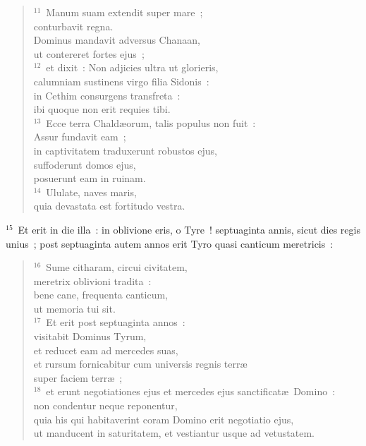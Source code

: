 \begin{flushleft}
\begin{verse}
${}^{11}$~Manum suam extendit super mare~;\\ conturbavit regna.\\ Dominus mandavit adversus Chanaan,\\ ut contereret fortes ejus~;\\
${}^{12}$~et dixit~: Non adjicies ultra ut glorieris,\\ calumniam sustinens virgo filia Sidonis~:\\ in Cethim consurgens transfreta~:\\ ibi quoque non erit requies tibi.\\
${}^{13}$~Ecce terra Chald\ae orum, talis populus non fuit~:\\ Assur fundavit eam~;\\ in captivitatem traduxerunt robustos ejus,\\ suffoderunt domos ejus,\\ posuerunt eam in ruinam.\\
${}^{14}$~Ululate, naves maris,\\ quia devastata est fortitudo vestra.\end{verse}\end{flushleft}


${}^{15}$~Et erit in die illa~: in oblivione eris, o Tyre~! septuaginta annis, sicut dies regis unius~; post septuaginta autem annos erit Tyro quasi canticum meretricis~:
\begin{flushleft}\begin{verse}${}^{16}$~Sume citharam, circui civitatem,\\ meretrix oblivioni tradita~:\\ bene cane, frequenta canticum,\\ ut memoria tui sit.\\
${}^{17}$~Et erit post septuaginta annos~:\\ visitabit Dominus Tyrum,\\ et reducet eam ad mercedes suas,\\ et rursum fornicabitur cum universis regnis terr\ae \\ super faciem terr\ae~;\\
${}^{18}$~et erunt negotiationes ejus et mercedes ejus sanctificat\ae\ Domino~:\\ non condentur neque reponentur,\\ quia his qui habitaverint coram Domino erit negotiatio ejus,\\ ut manducent in saturitatem, et vestiantur usque ad vetustatem.\end{verse}\end{flushleft}


